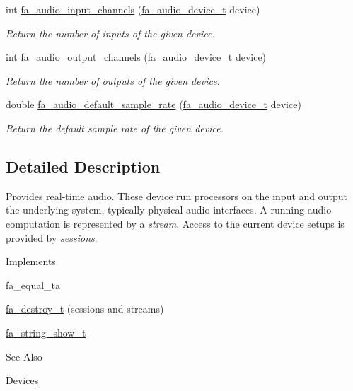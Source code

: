 \begin{DoxyCompactItemize}
int \hyperlink{group___fa_audio_device_ga459971e7fd609eb0bb9f7ac0fffc156b}{fa\-\_\-audio\-\_\-input\-\_\-channels} (\hyperlink{group___fa_audio_device_ga03de89ee66c6465f8cedd3a0286598f4}{fa\-\_\-audio\-\_\-device\-\_\-t} device)
\begin{DoxyCompactList}\small\item\em Return the number of inputs of the given device. \end{DoxyCompactList}\item 
int \hyperlink{group___fa_audio_device_gae43be40282fd7dc66137eebb768bc30e}{fa\-\_\-audio\-\_\-output\-\_\-channels} (\hyperlink{group___fa_audio_device_ga03de89ee66c6465f8cedd3a0286598f4}{fa\-\_\-audio\-\_\-device\-\_\-t} device)
\begin{DoxyCompactList}\small\item\em Return the number of outputs of the given device. \end{DoxyCompactList}\item 
double \hyperlink{group___fa_audio_device_ga3b38715cc1c124dabb1c332f6a6f8e6d}{fa\-\_\-audio\-\_\-default\-\_\-sample\-\_\-rate} (\hyperlink{group___fa_audio_device_ga03de89ee66c6465f8cedd3a0286598f4}{fa\-\_\-audio\-\_\-device\-\_\-t} device)
\begin{DoxyCompactList}\small\item\em Return the default sample rate of the given device. \end{DoxyCompactList}\end{DoxyCompactItemize}


\subsection{Detailed Description}
Provides real-\/time audio. These device run processors on the input and output the underlying system, typically physical audio interfaces. A running audio computation is represented by a {\itshape stream}. Access to the current device setups is provided by {\itshape sessions}.

\begin{DoxyParagraph}{Implements}

\begin{DoxyItemize}
\item fa\-\_\-equal\-\_\-ta
\item \hyperlink{structfa__destroy__t}{fa\-\_\-destroy\-\_\-t} (sessions and streams)
\item \hyperlink{structfa__string__show__t}{fa\-\_\-string\-\_\-show\-\_\-t}
\end{DoxyItemize}
\end{DoxyParagraph}
\begin{DoxySeeAlso}{See Also}

\begin{DoxyItemize}
\item \hyperlink{md__devices_Devices}{Devices} 
\end{DoxyItemize}
\end{DoxySeeAlso}


